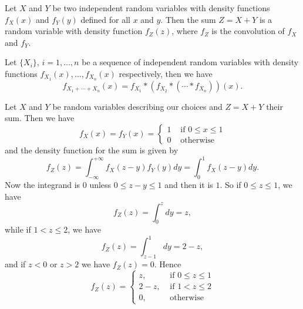\begin{theorem}
Let $X$ and $Y$ be two independent random variables with density functions $f_X(x)$ and $f_Y(y)$ defined for all $x$ and $y$. Then the sum $Z = X + Y$ is a random variable with density function $f_Z(z)$, where $f_Z$ is the convolution of $f_X$ and $f_Y$.
\end{theorem}

\begin{theorem}
Let $\{X_i\}$, $i=1,\dots, n$ be a sequence of independent random variables with density functions $f_{X_1}(x), \dots, f_{X_n}(x)$ respectively, then we have 
\begin{equation*}
    f_{X_1 + \cdots + X_n}(x) = f_{X_1} * \left( f_{X_2} * ( \cdots * f_{X_n}) \right)(x).
\end{equation*}
\end{theorem}

\begin{example}
Let $X$ and $Y$ be random variables describing our choices and $Z = X + Y$ their sum. Then we have
\begin{equation*}
    f_{X}(x)=f_{Y}(x)=\left\{\begin{array}{ll}{1} & {\text { if } 0 \leq x \leq 1} \\ {0} & {\text { otherwise }}\end{array}\right.
\end{equation*}
and the density function for the sum is given by
\begin{equation*}
    f_{Z}(z)=\int_{-\infty}^{+\infty} f_{X}(z-y) f_{Y}(y) d y = \int_{0}^{1} f_{X}(z-y) d y.
\end{equation*}
Now the integrand is $0$ unless $0 \leq z-y \leq 1$ and then it is $1$. So if $0 \leq z \leq 1$, we have 
\begin{equation*}
    f_{Z}(z)=\int_{0}^{z} d y=z,
\end{equation*}
while if $1 < z \leq 2$, we have
\begin{equation*}
    f_{Z}(z)=\int_{z-1}^{1} d y=2-z, 
\end{equation*}
and if $z < 0$ or $z > 2$ we have $f_Z(z) = 0$. Hence
\begin{equation*}
    f_{Z}(z)=\left\{\begin{array}{ll}{z,} & {\text { if } 0 \leq z \leq 1} \\ {2-z,} & {\text { if } 1<z \leq 2} \\ {0,} & {\text { otherwise }}\end{array}\right.
\end{equation*}
\end{example}

